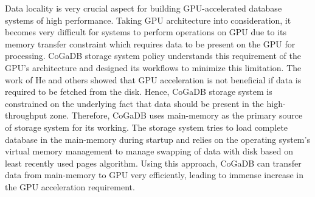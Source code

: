 Data locality is very crucial aspect for building GPU-accelerated database systems of high performance. Taking GPU architecture into consideration, it becomes very difficult for systems to perform operations on GPU due to its memory transfer constraint which requires data to be present on the GPU for processing. CoGaDB storage system policy understands this requirement of the GPU's architecture and designed its workflows to minimize this limitation.
\newline
The work of He and others showed that GPU acceleration is not beneficial if data is required to be fetched from the disk\cite{cogadb_relational_query}. Hence, CoGaDB storage system is constrained on the underlying fact that data should be present in the high-throughput zone. Therefore, CoGaDB uses main-memory as the primary source of storage system for its working. 
\newline
The storage system tries to load complete database in the main-memory during startup and relies on the operating system's virtual memory management to manage swapping of data with disk based on least recently used pages algorithm. Using this approach, CoGaDB can transfer data from main-memory to GPU very efficiently, leading to immense increase in the GPU acceleration requirement.